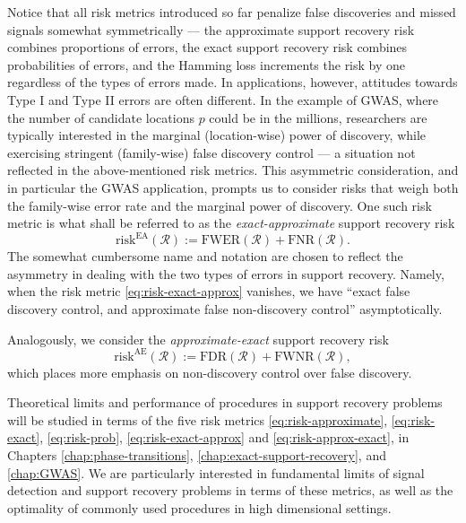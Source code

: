 Notice that all risk metrics introduced so far penalize false discoveries and missed signals somewhat symmetrically --- the approximate support recovery risk combines proportions of errors, the exact support recovery risk combines probabilities of errors, and the Hamming loss increments the risk by one regardless of the types of errors made.
In applications, however, attitudes towards Type I and Type II errors are often different.
In the example of GWAS, where the number of candidate locations $p$ could be in the millions, researchers are typically interested in the marginal (location-wise) power of discovery, while exercising stringent (family-wise) false discovery control --- a situation not reflected in the above-mentioned risk metrics.
This asymmetric consideration, and in particular the GWAS application, prompts us to consider risks that weigh both the family-wise error rate and the marginal power of discovery.
One such risk metric is what shall be referred to as the \emph{exact-approximate} support recovery risk
\begin{equation} \label{eq:risk-exact-approx}
    \mathrm{risk}^{\mathrm{EA}}(\mathcal{R}) := \mathrm{FWER}(\mathcal{R}) + \mathrm{FNR}(\mathcal{R}).
\end{equation}
The somewhat cumbersome name and notation are chosen to reflect
the asymmetry in dealing with the two types of errors in support recovery.
Namely, when the risk metric \eqref{eq:risk-exact-approx} vanishes, we have ``exact false discovery control, and approximate false non-discovery control'' asymptotically.

Analogously, we consider the \emph{approximate-exact} support recovery risk
\begin{equation} \label{eq:risk-approx-exact}
    \mathrm{risk}^{\mathrm{AE}}(\mathcal{R}) := \mathrm{FDR}(\mathcal{R}) + \mathrm{FWNR}(\mathcal{R}),
\end{equation}
which places more emphasis on non-discovery control over false discovery.

Theoretical limits and performance of procedures in support recovery problems will be studied in terms of the five risk metrics \eqref{eq:risk-approximate}, \eqref{eq:risk-exact}, \eqref{eq:risk-prob}, \eqref{eq:risk-exact-approx} and \eqref{eq:risk-approx-exact}, in Chapters \ref{chap:phase-transitions}, \ref{chap:exact-support-recovery}, and \ref{chap:GWAS}.
We are particularly interested in fundamental limits of signal detection and support recovery problems in terms of these metrics, as well as the optimality of commonly used procedures in high dimensional settings. 

